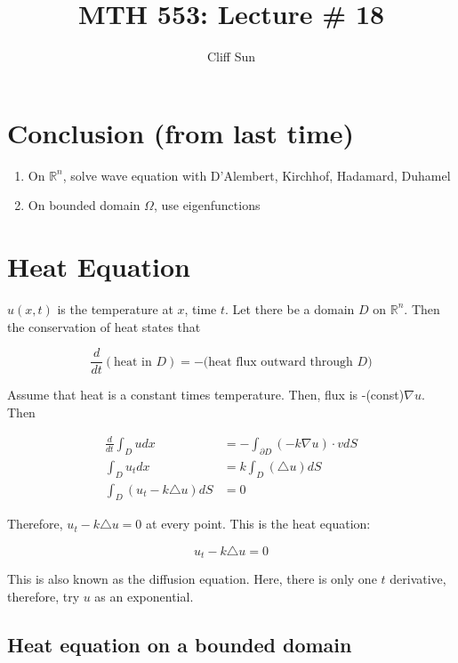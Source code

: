 \documentclass{article}
\title{MTH 553: Lecture \# 18}
\author{Cliff Sun}
\newtheorem{one minute paper}[theorem]{One Minute Paper}
\begin{document}
\maketitle

\section*{Conclusion (from last time)}

\begin{enumerate}
    \item On $\mathbb{R}^n$, solve wave equation with D'Alembert, Kirchhof, Hadamard, Duhamel
    \item On bounded domain $\Omega$, use eigenfunctions
\end{enumerate}

\section*{Heat Equation}

$u(x,t)$ is the temperature at $x$, time $t$. Let there be a domain $D$ on $\mathbb{R}^n$. Then the conservation of heat states that 

\begin{equation}
    \frac{d}{dt}\left( \text{heat in $D$} \right) = -\text{(heat flux outward through $D$)}
\end{equation}

Assume that heat is a constant times temperature. Then, flux is -(const)$\nabla u$. Then 

\begin{align*}
    \frac{d}{dt}\int_{D}u dx &= -\int_{\partial D}\left( -k \nabla u \right) \cdot v  dS \\
    \int_D u_t dx &= k \int_{D} \left( \triangle u \right)dS \\
    \int_D \left( u_t - k\triangle u \right)dS &= 0
\end{align*}

Therefore, $u_t - k\triangle u =0$ at every point. This is the heat equation:

\begin{equation}
    u_t - k\triangle u = 0
\end{equation}

This is also known as the diffusion equation. Here, there is only one $t$ derivative, therefore, try $u$ as an exponential. 

\subsection*{Heat equation on a bounded domain}
\end{document}
